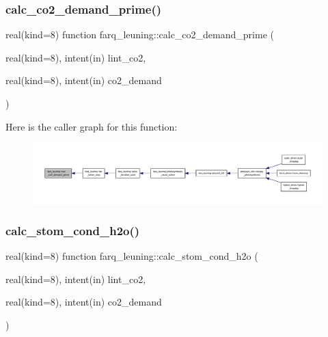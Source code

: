 \subsubsection{\texorpdfstring{calc\+\_\+co2\+\_\+demand\+\_\+prime()}{calc\_co2\_demand\_prime()}}
{\footnotesize\ttfamily real(kind=8) function farq\+\_\+leuning\+::calc\+\_\+co2\+\_\+demand\+\_\+prime (\begin{DoxyParamCaption}\item[{real(kind=8), intent(in)}]{lint\+\_\+co2,  }\item[{real(kind=8), intent(in)}]{co2\+\_\+demand }\end{DoxyParamCaption})}

Here is the caller graph for this function\+:
\nopagebreak
\begin{figure}[H]
\begin{center}
\leavevmode
\includegraphics[width=350pt]{namespacefarq__leuning_a4ea88f530f197b5a15c695c83e15e1a1_icgraph}
\end{center}
\end{figure}
\mbox{\label{namespacefarq__leuning_ae3bd8aaff5c63ef30cb1004d8a5c9639}} 
\subsubsection{\texorpdfstring{calc\+\_\+stom\+\_\+cond\+\_\+h2o()}{calc\_stom\_cond\_h2o()}}
{\footnotesize\ttfamily real(kind=8) function farq\+\_\+leuning\+::calc\+\_\+stom\+\_\+cond\+\_\+h2o (\begin{DoxyParamCaption}\item[{real(kind=8), intent(in)}]{lint\+\_\+co2,  }\item[{real(kind=8), intent(in)}]{co2\+\_\+demand }\end{DoxyParamCaption})}

